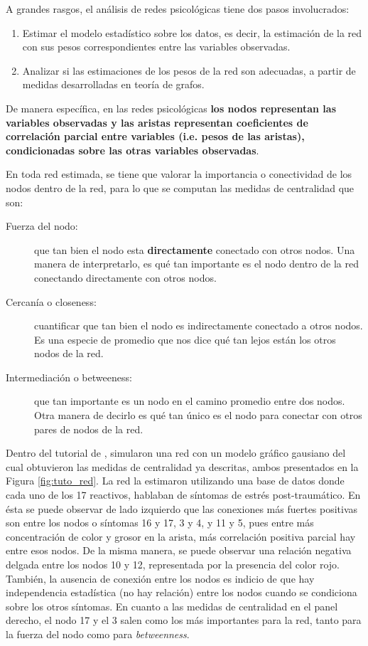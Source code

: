 \documentclass[11pt,spanish]{article}\usepackage[]{graphicx}\usepackage[]{color}
\begin{document}
A grandes rasgos, el análisis de redes psicológicas tiene dos pasos involucrados:

\begin{enumerate}
  \item Estimar el modelo estadístico sobre los datos, es decir, la estimación de la red con sus pesos correspondientes entre las variables observadas. 
  \item Analizar si las estimaciones de los pesos de la red son adecuadas, a partir de medidas desarrolladas en teoría de grafos. 
\end{enumerate}

De manera específica, en las redes psicológicas {\bf los nodos representan las variables observadas y las aristas representan coeficientes de correlación parcial entre variables (i.e. pesos de las aristas), condicionadas sobre las otras variables observadas}. 

En toda red estimada, se tiene que valorar la importancia o conectividad de los nodos dentro de la red, para lo que se computan las medidas de centralidad \citep{felipe} que son: 

\begin{description}
  \item[Fuerza del nodo:] que tan bien el nodo esta {\bf directamente} conectado con otros nodos. Una manera de interpretarlo, es qué tan importante es el nodo dentro de la red conectando directamente con otros nodos. 
  \item[Cercanía o closeness:] cuantificar que tan bien el nodo es indirectamente conectado a otros nodos. Es una especie de promedio que nos dice qué tan lejos están los otros nodos de la red. 
  \item[Intermediación o betweeness:] que tan importante es un nodo en el camino promedio entre dos nodos. Otra manera de decirlo es qué tan único es el nodo para conectar con otros pares de nodos de la red. 
\end{description}

Dentro del tutorial de \cite{main_tutorial}, simularon una red con un modelo gráfico gausiano del cual obtuvieron las medidas de centralidad ya descritas, ambos presentados en la Figura \ref{fig:tuto_red}. La red la estimaron utilizando una base de datos donde cada uno de los 17 reactivos, hablaban de síntomas de estrés post-traumático. En ésta se puede observar de lado izquierdo que las conexiones más fuertes positivas son entre los nodos o síntomas 16 y 17, 3 y 4, y 11 y 5, pues entre más concentración de color y grosor en la arista, más correlación positiva parcial hay entre esos nodos. De la misma manera, se puede observar una relación negativa delgada entre los nodos 10 y 12, representada por la presencia del color rojo. También, la ausencia de conexión entre los nodos es indicio de que hay independencia estadística (no hay relación) entre los nodos cuando se condiciona sobre los otros síntomas. En cuanto a las medidas de centralidad en el panel derecho, el nodo 17 y el 3 salen como los más importantes para la red, tanto para la fuerza del nodo como para \emph{betweenness}. 
\end{document}
